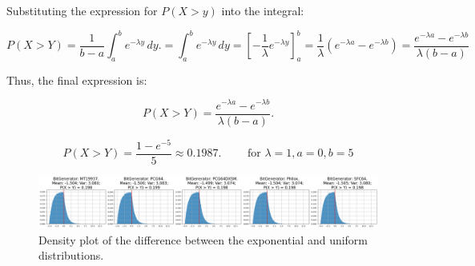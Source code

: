 \documentclass[a4paper,12pt]{article}
\renewenvironment{equation}
{\setlength{\mathindent}{0cm}%
  \begin{equation*}%
  }
  {
\end{equation*}}
\begin{document}
Substituting the expression for \(P(X > y)\) into the integral:

\begin{equation}
  P(X > Y) = \frac{1}{b-a} \int_a^b e^{-\lambda y} \, dy. =
  \int_a^b e^{-\lambda y} \, dy = {\left[ -\frac{1}{\lambda} e^{-\lambda y} \right]}_a^b = \frac{1}{\lambda}\left(e^{-\lambda a} - e^{-\lambda b}\right)
  = \frac{e^{-\lambda a} - e^{-\lambda b}}{\lambda (b-a)}
\end{equation}

Thus, the final expression is:

\begin{equation}
  \boxed{P(X > Y) = \frac{e^{-\lambda a} - e^{-\lambda b}}{\lambda (b-a)}.}
\end{equation}

\begin{equation}
  P(X > Y) = \frac{1 - e^{-5}}{5} \approx 0.1987. \qquad \text{ for } \lambda=1, a=0, b=5
\end{equation}

\begin{figure}[h]
  \centering
  \includegraphics[width=1\textwidth]{images/ex2-plot.png}
  \caption{Density plot of the difference between the exponential and uniform distributions.}
\end{figure}
\end{document}

